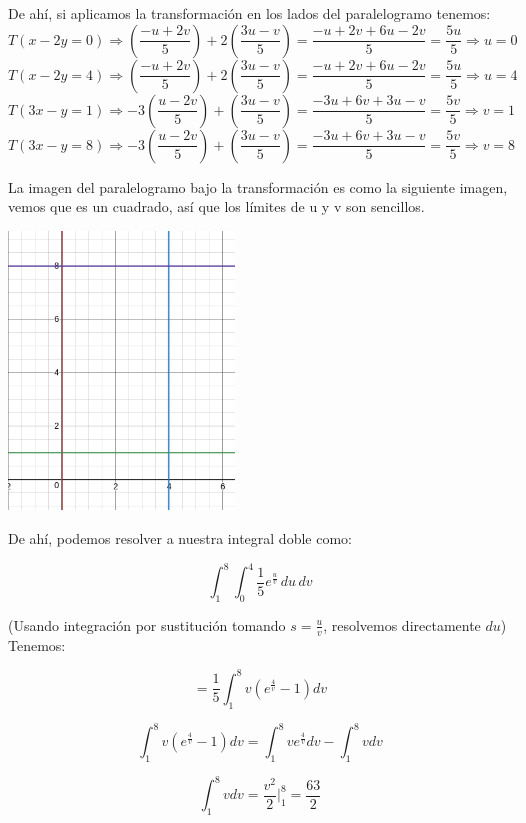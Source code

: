 \documentclass{article}
\begin{document}
\begin{enumerate}
{             De ahí, si aplicamos la transformación en los lados del
             paralelogramo tenemos:
             $$T(x-2y=0) \Rightarrow (\frac{-u+2v}{5}) + 2(\frac{3u-v}{5}) =
             \frac{-u+2v+6u-2v}{5} = \frac{5u}{5} \Rightarrow u = 0$$
             $$T(x-2y=4) \Rightarrow (\frac{-u+2v}{5}) + 2(\frac{3u-v}{5}) =
             \frac{-u+2v+6u-2v}{5} = \frac{5u}{5} \Rightarrow u = 4$$
             $$T(3x-y=1) \Rightarrow -3(\frac{u-2v}{5}) + (\frac{3u-v}{5}) =
             \frac{-3u+6v+3u-v}{5} = \frac{5v}{5} \Rightarrow v = 1$$
             $$T(3x-y=8) \Rightarrow -3(\frac{u-2v}{5}) + (\frac{3u-v}{5}) =
             \frac{-3u+6v+3u-v}{5} = \frac{5v}{5} \Rightarrow v = 8$$

         	La imagen del paralelogramo bajo la transformación es como la siguiente imagen, vemos que es un cuadrado, así que los límites de u y v son sencillos.
             \begin{center}
                 \includegraphics[width=6cm]{img/ejercicio2-1.png}
         	\end{center}
             De ahí, podemos resolver a nuestra integral doble como:

             $$\int_{1}^{8}\int_{0}^{4}\frac{1}{5}e^{\frac{u}{v}}\,du\,dv$$
            
             (Usando integración por sustitución tomando $s =\frac{u}{v}$,
             resolvemos directamente $du$) Tenemos:

             $$= \frac{1}{5} \int_{1}^{8} v(e^{\frac{4}{v}} -1)dv$$

             $$\int_{1}^{8} v(e^{\frac{4}{v}} -1)dv = \int_{1}^{8}
             ve^{\frac{4}{v}}dv - \int_{1}^{8} vdv$$

             $$\int_{1}^{8} vdv = \frac{v^2}{2}\Big|_1^8 = \frac{63}{2}$$
            
}
\end{enumerate}
\end{document}
